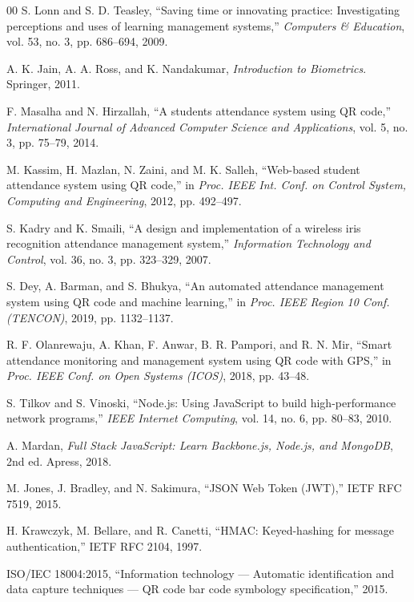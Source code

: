 \documentclass[conference]{IEEEtran}
\begin{document}
\begin{thebibliography}{00}
 S. Lonn and S. D. Teasley, ``Saving time or innovating practice: Investigating perceptions and uses of learning management systems,'' \textit{Computers \& Education}, vol. 53, no. 3, pp. 686--694, 2009.

 A. K. Jain, A. A. Ross, and K. Nandakumar, \textit{Introduction to Biometrics}. Springer, 2011.

 F. Masalha and N. Hirzallah, ``A students attendance system using QR code,'' \textit{International Journal of Advanced Computer Science and Applications}, vol. 5, no. 3, pp. 75--79, 2014.

 M. Kassim, H. Mazlan, N. Zaini, and M. K. Salleh, ``Web-based student attendance system using QR code,'' in \textit{Proc. IEEE Int. Conf. on Control System, Computing and Engineering}, 2012, pp. 492--497.

 S. Kadry and K. Smaili, ``A design and implementation of a wireless iris recognition attendance management system,'' \textit{Information Technology and Control}, vol. 36, no. 3, pp. 323--329, 2007.

 S. Dey, A. Barman, and S. Bhukya, ``An automated attendance management system using QR code and machine learning,'' in \textit{Proc. IEEE Region 10 Conf. (TENCON)}, 2019, pp. 1132--1137.

 R. F. Olanrewaju, A. Khan, F. Anwar, B. R. Pampori, and R. N. Mir, ``Smart attendance monitoring and management system using QR code with GPS,'' in \textit{Proc. IEEE Conf. on Open Systems (ICOS)}, 2018, pp. 43--48.

 S. Tilkov and S. Vinoski, ``Node.js: Using JavaScript to build high-performance network programs,'' \textit{IEEE Internet Computing}, vol. 14, no. 6, pp. 80--83, 2010.

 A. Mardan, \textit{Full Stack JavaScript: Learn Backbone.js, Node.js, and MongoDB}, 2nd ed. Apress, 2018.

 M. Jones, J. Bradley, and N. Sakimura, ``JSON Web Token (JWT),'' IETF RFC 7519, 2015.

 H. Krawczyk, M. Bellare, and R. Canetti, ``HMAC: Keyed-hashing for message authentication,'' IETF RFC 2104, 1997.

 ISO/IEC 18004:2015, ``Information technology --- Automatic identification and data capture techniques --- QR code bar code symbology specification,'' 2015.
\end{thebibliography}
\end{document}
